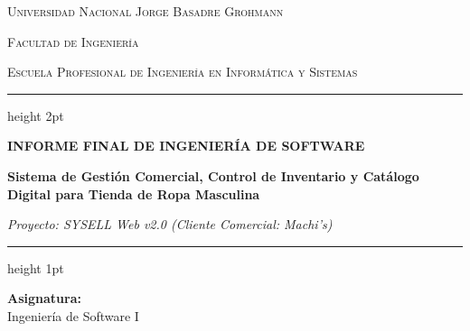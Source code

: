 \begin{titlepage}
    \centering
    \vspace*{0.5cm}
    
    {\scshape\LARGE Universidad Nacional Jorge Basadre Grohmann \par}
    \vspace{0.3cm}
    {\scshape\Large Facultad de Ingeniería \par}
    \vspace{0.2cm}
    {\scshape\large Escuela Profesional de Ingeniería en Informática y Sistemas \par}
    
    \vspace{1.5cm}
    \hrule height 2pt
    \vspace{0.4cm}
    {\huge\bfseries\color{primaryblue} INFORME FINAL DE INGENIERÍA DE SOFTWARE \par}
    \vspace{0.3cm}
    {\Large\bfseries Sistema de Gestión Comercial, Control de Inventario y Catálogo Digital para Tienda de Ropa Masculina \par}
    \vspace{0.2cm}
    {\large\textit{Proyecto: SYSELL Web v2.0 (Cliente Comercial: Machi's)} \par}
    \vspace{0.4cm}
    \hrule height 1pt
    \vspace{1.5cm}
    
    \textbf{\Large Asignatura:}\\[0.1cm]
    {\large Ingeniería de Software I}\\[1.0cm]
    

\end{titlepage}
